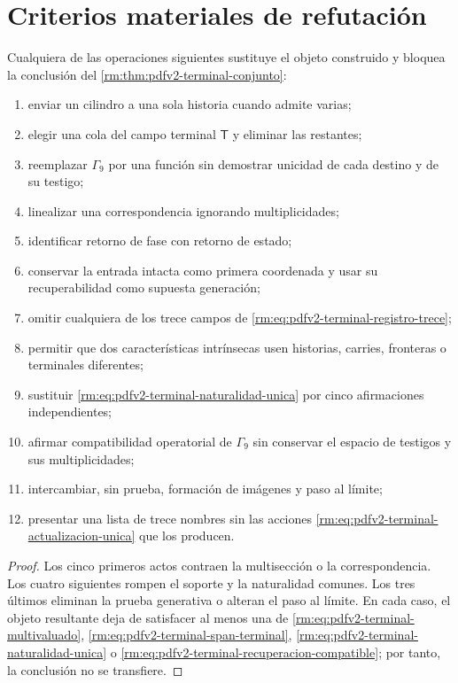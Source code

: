 \section{Criterios materiales de refutación}

\begin{proposition}
\label{rm:prop:pdfv2-terminal-falsadores}
Cualquiera de las operaciones siguientes sustituye el objeto construido y
bloquea la conclusi\'on del
\cref{rm:thm:pdfv2-terminal-conjunto}:
\begin{enumerate}
 \item enviar un cilindro a una sola historia cuando admite varias;
 \item elegir una cola del campo terminal \(\mathsf T\) y eliminar las
       restantes;
 \item reemplazar \(\Gamma_9\) por una funci\'on sin demostrar unicidad de
       cada destino y de su testigo;
 \item linealizar una correspondencia ignorando multiplicidades;
 \item identificar retorno de fase con retorno de estado;
 \item conservar la entrada intacta como primera coordenada y usar su
       recuperabilidad como supuesta generaci\'on;
 \item omitir cualquiera de los trece campos de
       \eqref{rm:eq:pdfv2-terminal-registro-trece};
 \item permitir que dos caracter\'isticas intr\'insecas usen historias,
       carries, fronteras o terminales diferentes;
 \item sustituir
       \eqref{rm:eq:pdfv2-terminal-naturalidad-unica} por cinco afirmaciones
       independientes;
 \item afirmar compatibilidad operatorial de \(\Gamma_9\) sin conservar el
       espacio de testigos y sus multiplicidades;
 \item intercambiar, sin prueba, formaci\'on de im\'agenes y paso al l\'imite;
 \item presentar una lista de trece nombres sin las acciones
       \eqref{rm:eq:pdfv2-terminal-actualizacion-unica} que los producen.
\end{enumerate}
\end{proposition}

\begin{proof}
Los cinco primeros actos contraen la multisecci\'on o la correspondencia. Los
cuatro siguientes rompen el soporte y la naturalidad comunes. Los tres
\'ultimos eliminan la prueba generativa o alteran el paso al l\'imite. En
cada caso, el objeto resultante deja de satisfacer al menos una de
\eqref{rm:eq:pdfv2-terminal-multivaluado},
\eqref{rm:eq:pdfv2-terminal-span-terminal},
\eqref{rm:eq:pdfv2-terminal-naturalidad-unica} o
\eqref{rm:eq:pdfv2-terminal-recuperacion-compatible}; por tanto, la conclusi\'on
no se transfiere.
\end{proof}

